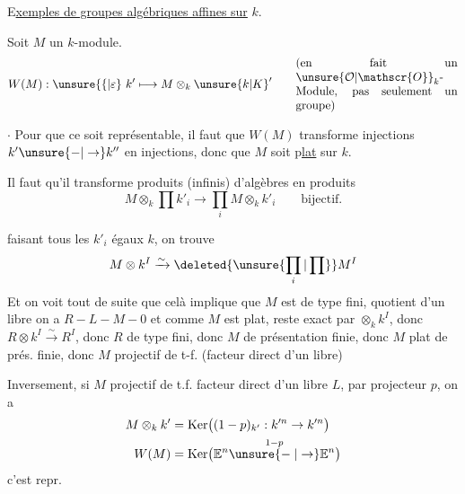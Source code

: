E\uline{xemples de groupes algébriques affines sur} $k$.


Soit $M$ un $k$-module.
\[
 W(M):\unsure{\{|\varepsilon}\ k'\longmapsto M\otimes_k \unsure{k|K}'
 \qquad\text{\parbox{.4\linewidth}{(en fait un $\unsure{\mathcal{O}|\mathscr{O}}_k$-Module, pas seulement un groupe)}}
\]

$\cdot$ Pour que ce soit représentable, il faut que $W(M)$ transforme injections $k'\unsure{-|\to} k''$ en injections, donc que $M$ soit p\uline{lat} sur $k$. 

Il faut qu'il transforme produits (infinis) d'algèbres en produits
\[
 M\otimes_k\prod k'_i\longrightarrow\prod_i M\otimes_k k'_i
 \qquad\text{bijectif.}
\]

 faisant tous les $k'_i$ égaux  $k$, on trouve
\[
 M\otimes k^I\xrightarrow{\sim}\deleted{\unsure{\prod_i|\prod}} M^I
\]
Et on voit tout de suite que celà implique que $M$ est de type fini,   quotient d'un libre    on a $R\mathrel{-}L\mathrel{-}M\mathrel{-}0$
et comme $M$ est plat,  reste exact par $\otimes_k k^I$, donc $R\otimes k^I\xrightarrow{\sim}R^I$, donc $R$ de type fini, donc $M$ de présentation finie, donc $M$ plat de prés. finie, donc $M$ projectif de t-f. (facteur direct d'un libre)

Inversement, si $M$ projectif de t.f.  facteur direct d'un libre $L$, par projecteur $p$, on a
\[
 \begin{aligned}
 M\otimes_k k'&=\mathrm{Ker}\big((1-p)_{k'}:k'^{n}\to k'^{n}\big)\\
 W(M)&=\mathrm{Ker}\big(\mathbb{E}^{n}\overset{1-p}{\unsure{\relbar|\to}}\mathbb{E}^{n}\big)
 \end{aligned}
\]
c'est repr.

